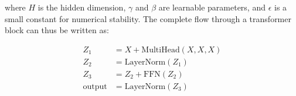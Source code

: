 where $H$ is the hidden dimension, $\gamma$ and $\beta$ are learnable parameters, and $\epsilon$ is a small constant for numerical stability.
The complete flow through a transformer block can thus be written as:

\begin{align}
Z_1 &= X + \text{MultiHead}(X, X, X) \\
Z_2 &= \text{LayerNorm}(Z_1) \\
Z_3 &= Z_2 + \text{FFN}(Z_2) \\
\text{output} &= \text{LayerNorm}(Z_3)
\end{align}